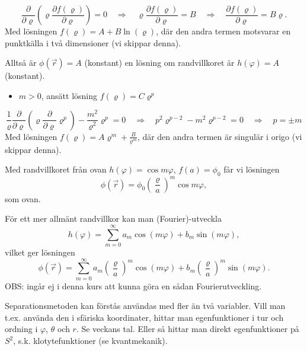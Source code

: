 \documentclass[%
oneside,                 %
final,                   %
10pt]{article}
\newenvironment{notice_mdfboxadmon}[1][]{
\begin{notice_mdfboxmdframed}[frametitle=#1]
}
{
\end{notice_mdfboxmdframed}
}
\newenvironment{warning_mdfboxadmon}[1][]{
\begin{warning_mdfboxmdframed}[frametitle=#1]
}
{
\end{warning_mdfboxmdframed}
}
\begin{document}
\begin{notice_mdfboxadmon}
\noindent
$$
\frac{\partial}{\partial\varrho} \left( \varrho \frac{\partial f(\varrho)}{\partial\varrho} \right) = 0 \quad \Rightarrow \quad
\varrho \frac{\partial f(\varrho)}{\partial\varrho} = B \quad \Rightarrow \quad
\frac{\partial f(\varrho)}{\partial\varrho} = B \varrho.
$$
Med lösningen $f(\varrho) = A + B \ln(\varrho)$, där den andra termen motsvarar en punktkälla i två dimensioner (vi skippar denna).

Alltså är $\phi(\vec{r}) = A$ (konstant) en lösning om randvillkoret är $h(\varphi) = A$ (konstant).

\begin{itemize}
\item $m > 0$, ansätt lösning $f(\varrho) = C \varrho^p$
\end{itemize}

\noindent
$$
\frac{1}{\varrho} \frac{\partial}{\partial\varrho} \left( \varrho \frac{\partial}{\partial\varrho} \varrho^p \right) - \frac{m^2}{\varrho^2} \varrho^p = 0 \quad \Rightarrow \quad p^2 \varrho^{p-2} - m^2 \varrho^{p-2} = 0 \quad \Rightarrow \quad 
p = \pm m
$$
Med lösningen $f(\varrho) = A \varrho^m + \frac{B}{\varrho^m}$, där den andra termen är singulär i origo (vi skippar denna).

Med randvillkoret från ovan $h(\varphi) = \cos m \varphi$, $f(a) = \phi_0$ får vi lösningen
$$
\phi(\vec{r}) = \phi_0 \left( \frac{\varrho}{a} \right)^m \cos m\varphi,
$$
som ovan.

För ett mer allmänt randvillkor kan man (Fourier)-utveckla
$$
h(\varphi) = \sum_{m=0}^\infty a_m \cos(m\varphi) + b_m \sin(m\varphi),
$$
vilket ger lösningen
$$
\phi(\vec{r}) = \sum_{m=0}^\infty a_m \left( \frac{\varrho}{a} \right)^m \cos(m\varphi) + b_m \left( \frac{\varrho}{a} \right)^m \sin(m\varphi).
$$
OBS: ingår ej i denna kurs att kunna göra en sådan Fourierutveckling.
\end{notice_mdfboxadmon} %




\begin{warning_mdfboxadmon}[Kommentar]
Separationsmetoden kan förstås användas med fler än två variabler. Vill man t.ex. använda den i sfäriska koordinater, hittar man egenfunktioner i tur och ordning i $\varphi$, $\theta$ och $r$. Se veckans tal. Eller så hittar man direkt egenfunktioner på $S^2$, s.k. klotytefunktioner (se kvantmekanik).
\end{warning_mdfboxadmon} %
\end{document}
